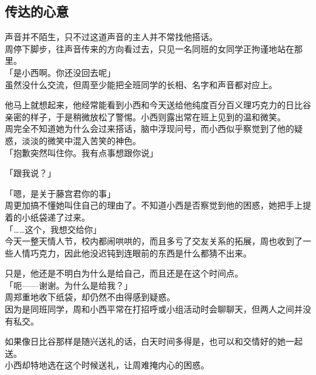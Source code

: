 \subsection{传达的心意}

声音并不陌生，只不过这道声音的主人并不常找他搭话。\\

周停下脚步，往声音传来的方向看过去，只见一名同班的女同学正拘谨地站在那里。\\

「是小西啊。你还没回去呢」\\

虽然没什么交流，但周至少能把全班同学的长相、名字和声音都对应上。

他马上就想起来，他经常能看到小西和今天送给他纯度百分百义理巧克力的日比谷亲密的样子，于是稍微放松了警惕。小西则露出常在班上见到的温和微笑。\\

周完全不知道她为什么会过来搭话，脑中浮现问号，而小西似乎察觉到了他的疑惑，淡淡的微笑中混入苦笑的神色。\\

「抱歉突然叫住你。我有点事想跟你说」

「跟我说？」

「嗯，是关于藤宫君你的事」\\

周更加搞不懂她叫住自己的理由了。不知道小西是否察觉到他的困惑，她把手上提着的小纸袋递了过来。\\

「……这个，我想交给你」\\

今天一整天情人节，校内都闹哄哄的，而且多亏了交友关系的拓展，周也收到了一些人情巧克力，因此他没迟钝到连眼前的东西是什么都猜不出来。

只是，他还是不明白为什么是给自己，而且还是在这个时间点。\\

「呃——谢谢。为什么是给我？」\\

周郑重地收下纸袋，却仍然不由得感到疑惑。\\

因为是同班同学，周和小西平常在打招呼或小组活动时会聊聊天，但两人之间并没有私交。

如果像日比谷那样是随兴送礼的话，白天时间多得是，也可以和交情好的她一起送。\\

小西却特地选在这个时候送礼，让周难掩内心的困惑。\\

